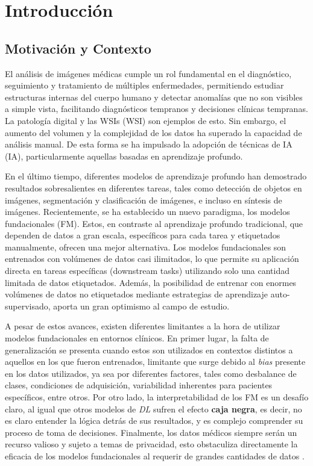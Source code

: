 \chapter{Introducción}

\section{Motivación y Contexto}

El análisis de imágenes médicas cumple un rol fundamental en el diagnóstico, seguimiento y tratamiento de múltiples enfermedades, permitiendo estudiar estructuras internas del cuerpo humano y detectar anomalías que no son visibles a simple vista, facilitando diagnósticos tempranos y decisiones clínicas tempranas. La patología digital y las \glspl{WSI} (WSI) son ejemplos de esto. Sin embargo, el aumento del volumen y la complejidad de los datos ha superado la capacidad de análisis manual. De esta forma se ha impulsado la adopción de técnicas de \gls{IA} (IA), particularmente aquellas basadas en aprendizaje profundo.

En el último tiempo, diferentes modelos de aprendizaje profundo han demostrado resultados sobresalientes en diferentes tareas, tales como detección de objetos en imágenes, segmentación y clasificación de imágenes, e incluso en síntesis de imágenes. Recientemente, se ha establecido un nuevo paradigma, los modelos fundacionales (FM). Estos, en contraste al aprendizaje profundo tradicional, que dependen de datos a gran escala, específicos para cada tarea y etiquetados manualmente, ofrecen una mejor alternativa. Los modelos fundacionales son entrenados con volúmenes de datos casi ilimitados, lo que permite su aplicación directa en tareas específicas (downstream tasks) utilizando solo una cantidad limitada de datos etiquetados. Además, la posibilidad de entrenar con enormes volúmenes de datos no etiquetados mediante estrategias de aprendizaje auto-supervisado, aporta un gran optimismo al campo de estudio.

A pesar de estos avances, existen diferentes limitantes a la hora de utilizar modelos fundacionales en entornos clínicos. En primer lugar, la falta de generalización se presenta cuando estos son utilizados en contextos distintos a aquellos en los que fueron entrenados, limitante que surge debido al \textit{bias} presente en los datos utilizados, ya sea por diferentes factores, tales como desbalance de clases, condiciones de adquisición, variabilidad inherentes para pacientes específicos, entre otros. Por otro lado, la interpretabilidad de los FM es un desafío claro, al igual que otros modelos de \textit{\gls{DL}} sufren el efecto \textbf{caja negra}, es decir, no es claro entender la lógica detrás de sus resultados, y es complejo comprender su proceso de toma de decisiones. Finalmente, los datos médicos siempre serán un recurso valioso y sujeto a temas de privacidad, esto obstaculiza directamente la eficacia de los modelos fundacionales al requerir de grandes cantidades de datos \parencite{ubae018}.

